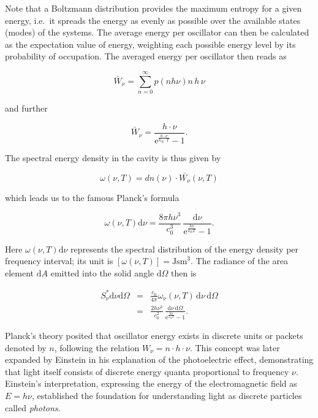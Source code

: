 \documentclass[
  a4paper,
]{book}
\begin{document}
Note that a Boltzmann distribution provides the maximum entropy for a
given energy, i.e.~it spreads the energy as evenly as possible over the
available states (modes) of the systems. The average energy per
oscillator can then be calculated as the expectation value of energy,
weighting each possible energy level by its probability of occupation.
The averaged energy per oscillator then reads as

\[
\bar{W}_{\nu} = \sum_{n=0}^{\infty} p\left( nh\nu \right) n \, h\, \nu
\]

and further

\[
\bar{W}_{\nu} = \frac{h \cdot \nu}{\mathrm{e}^{\frac{h \cdot \nu}{k_B \cdot T}} -1} \mathrm{.}
\]

The spectral energy density in the cavity is thus given by

\[
\omega \left( \nu,T \right) = dn\left(\nu \right) \cdot \bar{W_{\nu}} \left( \nu,T \right)
\]

which leads us to the famous Planck's formula

\[
\omega \left( \nu,T \right) \mathrm{d} \nu = \frac{8 \pi h \nu^3}{c_0^3} \, \frac{\mathrm{d} \nu}{\mathrm{e}^{\frac{h \nu}{k_B T}} -1} \mathrm{.}
\]

Here \(\omega \left( \nu,T \right) \mathrm{d}\nu\) represents the
spectral distribution of the energy density per frequency interval; its
unit is \(\left[ \omega \left( \nu,T \right) \right] = \mbox{Jsm}^3\).
The radiance of the area element \(\mathrm{d}A\) emitted into the solid
angle \(\mathrm{d} \Omega\) then is

\[
\begin{aligned}
S^{\ast}_{\nu} \mathrm{d} \nu \mathrm{d} \Omega & = & \frac{c_0}{4\pi} \omega_{\nu} \left(\nu,T\right) \, \mathrm{d} \nu \, \mathrm{d} \Omega\\
{} & = & \frac{2 h \nu^3}{c_0^2} \, \frac{\mathrm{d} \nu \, \mathrm{d} \Omega}{\mathrm{e}^{\frac{h \nu}{k_B T}} -1} \mathrm{.}
\end{aligned}
\]

Planck's theory posited that oscillator energy exists in discrete units
or packets denoted by \(n\), following the relation
\(W_{\nu} = n \cdot h \cdot \nu\). This concept was later expanded by
Einstein in his explanation of the photoelectric effect, demonstrating
that light itself consists of discrete energy quanta proportional to
frequency \(\nu\). Einstein's interpretation, expressing the energy of
the electromagnetic field as \(E = h \nu\), established the foundation
for understanding light as discrete particles called \emph{photons}.
\end{document}
